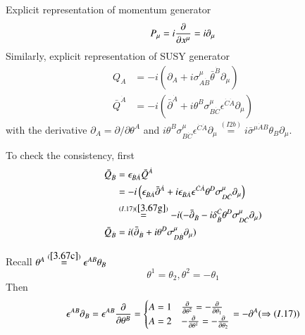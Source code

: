 Explicit representation of momentum generator
\begin{equation}
   P_\mu = i \pdv{x^\mu} = i \partial_\mu \label{3.95}
\end{equation}
Similarly, explicit representation of SUSY generator
\begin{subequations}
   \label{3.96}
  \begin{align}
     Q_A &= -i(\partial_A + i \sigma^\mu_{A \dot{B}} \bar{\theta}^{\dot{B}} \partial_\mu) \label{3.96a} \\
     \bar{Q}^{\dot{A}} &= -i(\bar{\partial}^{\dot{A}} + i \theta^B \sigma^\mu_{B \dot{C}} \epsilon^{\dot{C}\dot{A}} \partial_\mu) \label{3.96b}
  \end{align} 
\end{subequations}
with the derivative $\partial_A = \partial/\partial \theta^A$ and $i \theta^B \sigma^\mu_{B \dot{C}} \epsilon^{\dot{C} \dot{A}} \partial_\mu \stackrel{(I2b)}{=} i \bar{\sigma}^{\mu \dot{A} B} \theta_B \partial_\mu$.

To check the consistency, first
\begin{align*}
   \bar{Q}_{\dot{B}} &= \epsilon_{\dot{B}\dot{A}} \bar{Q}^{\dot{A}} \\
                     &= -i \left( \epsilon_{\dot{B}\dot{A}} \bar\partial^{\dot{A}} + i \epsilon_{\dot{B}\dot{A}} \epsilon^{\dot{C}\dot{A}} \theta^D \sigma^\mu_{D \dot{C}} \partial_\mu \right) \\
                     & \stackrel{(I.17) (\ref{3.67g})}{=} -i (- \bar{\partial}_{\dot{B}} - i \delta^{\dot{C}}_{\dot{B}} \theta^D \sigma^\mu_{D \dot{C}} \partial_\mu) \\
   \bar{Q}_{\dot{B}} &= i (\bar{\partial}_{\dot{B}} + i \theta^D \sigma^\mu_{D \dot{B}} \partial_\mu)
\end{align*}

Recall $\theta^A \stackrel{(\ref{3.67c})}{=} \epsilon^{AB}\theta_B$
\begin{equation*}
   \theta^1 = \theta_2, \theta^2 = -\theta_1
\end{equation*}
Then
\begin{equation*}
   \epsilon^{AB}\partial_B = \epsilon^{AB} \pdv{\theta^B} = 
   \begin{cases}
      A = 1 & \pdv{\theta^2} = - \pdv{\theta_1}  \\
      A = 2 & -\pdv{\theta^1} = - \pdv{\theta_2}
   \end{cases} 
   = - \partial^A (\Rightarrow (I.17))
\end{equation*}

